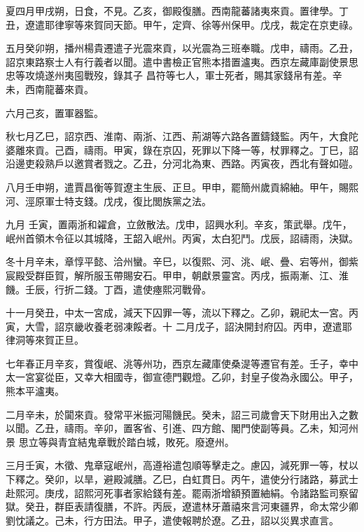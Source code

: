 \begin{pinyinscope}
 夏四月甲戌朔，日食，不見。乙亥，御殿復膳。西南龍蕃諸夷來貢。置律學。丁丑，遼遣耶律寧等來賀同天節。甲午，定齊、徐等州保甲。戊戌，裁定在京吏祿。



 五月癸卯朔，播州楊貴遷遣子光震來貢，以光震為三班奉職。戊申，禱雨。乙丑，詔京東路察士人有行義者以聞。遣中書檢正官熊本措置瀘夷。西京左藏庫副使景思忠等攻燒遂州夷囤戰歿，錄其子
 昌符等七人，軍士死者，賜其家錢帛有差。辛未，西南龍蕃來貢。



 六月己亥，置軍器監。



 秋七月乙巳，詔京西、淮南、兩浙、江西、荊湖等六路各置鑄錢監。丙午，大食陀婆離來貢。己酉，禱雨。甲寅，錄在京囚，死罪以下降一等，杖罪釋之。丁巳，詔沿邊吏殺熟戶以邀賞者戮之。乙丑，分河北為東、西路。丙寅夜，西北有聲如磑。



 八月壬申朔，遣賈昌衡等賀遼主生辰、正旦。甲申，罷簡州歲貢綿紬。甲午，賜熙河、涇原軍士特支錢。戊戌，復比閭族黨之法。



 九月
 壬寅，置兩浙和糴倉，立斂散法。戊申，詔興水利。辛亥，策武舉。戊午，岷州首領木令征以其城降，王韶入岷州。丙寅，太白犯鬥。戊辰，詔禱雨，決獄。



 冬十月辛未，章惇平懿、洽州蠻。辛巳，以復熙、河、洮、岷、疊、宕等州，御紫宸殿受群臣賀，解所服玉帶賜安石。甲申，朝獻景靈宮。丙戌，振兩漸、江、淮饑。壬辰，行折二錢。丁酉，遣使瘞熙河戰骨。



 十一月癸丑，中太一宮成，減天下囚罪一等，流以下釋之。乙卯，親祀太一宮。丙寅，大雪，詔京畿收養老弱凍餒者。十
 二月戊子，詔決開封府囚。丙申，遼遣耶律洞等來賀正旦。



 七年春正月辛亥，賞復岷、洮等州功，西京左藏庫使桑湜等遷官有差。壬子，幸中太一宮宴從臣，又幸大相國寺，御宣德門觀燈。乙卯，封皇子俊為永國公。甲子，熊本平瀘夷。



 二月辛未，於闐來貢。發常平米振河陽饑民。癸未，詔三司歲會天下財用出入之數以聞。乙丑，禱雨。辛卯，置客省、引進、四方館、閣門使副等員。乙未，知河州景
 思立等與青宜結鬼章戰於踏白城，敗死。廢遼州。



 三月壬寅，木徵、鬼章寇岷州，高遵裕遣包順等擊走之。慮囚，減死罪一等，杖以下釋之。癸卯，以旱，避殿減膳。乙巳，白虹貫日。丙午，遣使分行諸路，募武士赴熙河。庚戌，詔熙河死事者家給錢有差。罷兩浙增額預置紬絹。令諸路監司察留獄。癸丑，群臣表請復膳，不許。丙辰，遼遣林牙蕭禧來言河東疆界，命太常少卿劉忱議之。己未，行方田法。甲子，遣使報聘於遼。乙丑，詔以災異求直言。




\end{pinyinscope}
